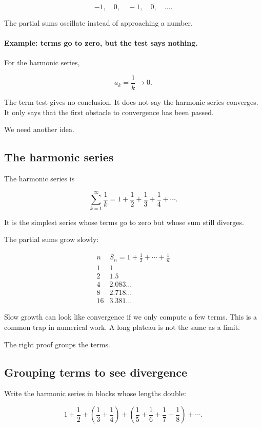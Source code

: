 \[
-1,
\quad 0,
\quad -1,
\quad 0,
\quad\ldots.
\]

The partial sums oscillate instead of approaching a number.

\paragraph{Example: terms go to zero, but the test says nothing.}
For the harmonic series,

\[
a_k=\frac1k\to0.
\]

The term test gives no conclusion.  It does not say the harmonic series converges.
It only says that the first obstacle to convergence has been passed.

We need another idea.

\subsection{The harmonic series}
\label{subsec:harmonic-series}

The harmonic series is

\[
\boxed{
\sum_{k=1}^{\infty}\frac1k
=1+\frac12+\frac13+\frac14+\cdots.
}
\]

It is the simplest series whose terms go to zero but whose sum still diverges.

The partial sums grow slowly:

\[
\begin{array}{c|c}
 n & S_n=1+\frac12+\cdots+\frac1n \\ \hline
 1 & 1 \\
 2 & 1.5 \\
 4 & 2.083\ldots \\
 8 & 2.718\ldots \\
 16 & 3.381\ldots
\end{array}
\]

Slow growth can look like convergence if we only compute a few terms.  This is a
common trap in numerical work.  A long plateau is not the same as a limit.

The right proof groups the terms.

\subsection{Grouping terms to see divergence}
\label{subsec:grouping-harmonic-divergence}

Write the harmonic series in blocks whose lengths double:

\[
1
+\frac12
+\left(\frac13+\frac14\right)
+\left(\frac15+\frac16+\frac17+\frac18\right)
+\cdots.
\]

